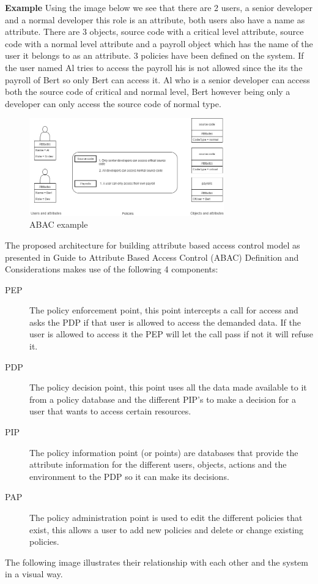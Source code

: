 \textbf{Example} Using the image below we see that there are 2 users, a senior developer and a normal developer this role is an attribute, both users also have a name as attribute.
There are 3 objects, source code with a critical level attribute, source code with a normal level attribute and a payroll object which has the name of the user it belongs to as an attribute.
3 policies have been defined on the system.
If the user named Al tries to access the payroll his is not allowed since the its the payroll of Bert so only Bert can access it.
Al who is a senior developer can access both the source code of critical and normal level, Bert however being only a developer can only access the source code of normal type.

\begin{figure}[ht]
    \centering
    \includegraphics[height=0.45\textwidth, width=0.75\textwidth]{Img/self/ABACExample.jpg}
    \caption{ABAC example}
\end{figure}
The proposed architecture for building  attribute based  access control model as presented in Guide to Attribute Based Access Control (ABAC) Definition and Considerations \cite{ABAC} makes use of the following 4 components:
\begin{description}
    \item [PEP] The policy enforcement point, this point intercepts a call for access and asks the PDP if that user is allowed to access the demanded data.
    If the user is allowed to access it the PEP will let the call pass if not it will refuse it.
    \item [PDP] The policy decision point, this point uses all the data made available to it from a policy database and the different PIP's to make a decision for a user that wants to access certain resources.
    \item [PIP] The policy information point (or points) are databases that provide the attribute information for the different users, objects, actions and the environment to the PDP so it can make its decisions.
    \item [PAP] The policy administration point is used to edit the different policies that exist, this allows a user to add new policies and delete or change existing policies.
\end{description}
The following image illustrates their relationship with each other and the system in a visual way.

